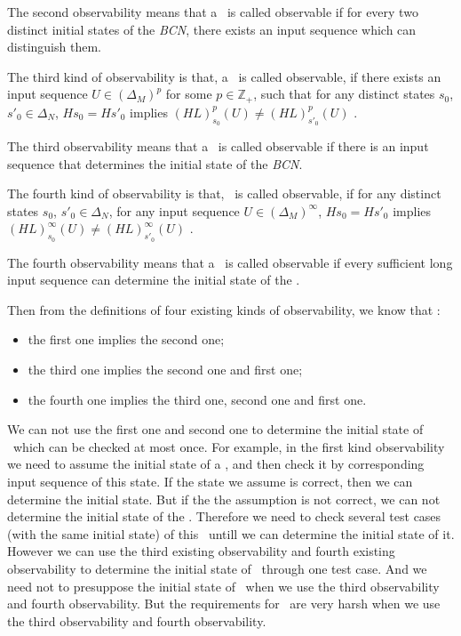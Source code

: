 The second observability means that a \BCN\ is called observable if for every two distinct initial states of the {\em BCN}, there exists an input sequence which can distinguish them. 
\begin{definition}
	The third kind of observability is that, a \BCN\ is called observable, if there exists an input sequence $U\in(\Delta_M)^p$ for some $p\in \mathbb{Z}_+$, such that for any distinct states $s_0$, ${s'}_0 \in \Delta_N$, $Hs_0=H{s'}_0$ implies $(HL)^p_{s_0}(U)\neq (HL)^p_{{s'}_0}(U)$ \cite{Cheng2011Identification}.
\end{definition}

The third observability means that a \BCN\ is called observable if there is an input sequence that determines the initial state of the {\em BCN}.
\begin{definition}
	The fourth kind of observability is that, \BCN\ is called observable, if for any distinct states $s_0$, ${s'}_0 \in \Delta_N$, for any input sequence $U\in(\Delta_M)^{\infty}$, $Hs_0=H{s'}_0$ implies $(HL)^{\infty}_{s_0}(U)\neq (HL)^{\infty}_{{s'}_0}(U)$ \cite{Fornasini2013Observability}.
\end{definition}

The fourth observability means that a \BCN\ is called observable if every sufficient long input sequence can determine the initial state of the \BCN.

Then from the definitions of  four existing kinds of observability, we know that \cite{Zhang2016Observability}:
\begin{itemize}
  \item the first one implies the second one;
  \item the third one implies the second one and first one;
  \item the fourth one implies the third one, second one and first one.
\end{itemize} 
 
We can not use the first one and second one to determine the initial state of \BCNs\ which can be checked at most once. For example, in the first kind observability we need to assume the initial state of a \BCN, and then check it by corresponding input sequence of this state. If the state we assume is correct, then we can determine the initial state. But if the the assumption is not correct, we can not determine the initial state of the \BCN. Therefore we need to check several test cases (with the same initial state) of this \BCN\ untill we can determine the initial state of it. However we can use the third existing observability and fourth existing observability to determine the initial state of \BCNs\ through one test case. And we need not to presuppose the initial state of \BCNs\ when we use the third observability and fourth observability. But the requirements for \BCNs\ are very harsh when we use the third observability and fourth observability.
 
